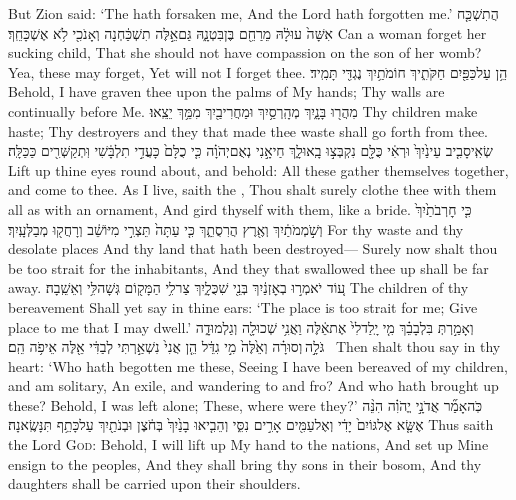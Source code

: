 {But Zion said: ‘The \lord\space hath forsaken me, And the Lord hath forgotten me.’}
{הֲתִשְׁכַּ֤ח אִשָּׁה֙ עוּלָ֔הּ מֵרַחֵ֖ם בֶּן\maqqaf בִּטְנָ֑הּ גַּם\maqqaf אֵ֣לֶּה תִשְׁכַּ֔חְנָה וְאָנֹכִ֖י לֹ֥א אֶשְׁכָּחֵֽךְ׃}
{Can a woman forget her sucking child, That she should not have compassion on the son of her womb? Yea, these may forget, Yet will not I forget thee.}
{הֵ֥ן עַל\maqqaf כַּפַּ֖יִם חַקֹּתִ֑יךְ חוֹמֹתַ֥יִךְ נֶגְדִּ֖י תָּמִֽיד׃}
{Behold, I have graven thee upon the palms of My hands; Thy walls are continually before Me.}
{מִהֲר֖וּ בָּנָ֑יִךְ מְהָֽרְסַ֥יִךְ וּמַחֲרִיבַ֖יִךְ מִמֵּ֥ךְ יֵצֵֽאוּ׃}
{Thy children make haste; Thy destroyers and they that made thee waste shall go forth from thee.}
{שְׂאִֽי\maqqaf סָבִ֤יב עֵינַ֙יִךְ֙ וּרְאִ֔י כֻּלָּ֖ם נִקְבְּצ֣וּ בָֽאוּ\maqqaf לָ֑ךְ חַי\maqqaf אָ֣נִי נְאֻם\maqqaf יְהֹוָ֗ה כִּ֤י כֻלָּם֙ כָּעֲדִ֣י תִלְבָּ֔שִׁי וּֽתְקַשְּׁרִ֖ים כַּכַּלָּֽה׃}
{Lift up thine eyes round about, and behold: All these gather themselves together, and come to thee. As I live, saith the \lord, Thou shalt surely clothe thee with them all as with an ornament, And gird thyself with them, like a bride.}
{כִּ֤י חׇרְבֹתַ֙יִךְ֙ וְשֹׁ֣מְמֹתַ֔יִךְ וְאֶ֖רֶץ הֲרִסֻתֵ֑ךְ כִּ֤י עַתָּה֙ תֵּצְרִ֣י מִיּוֹשֵׁ֔ב וְרָחֲק֖וּ מְבַלְּעָֽיִךְ׃}
{For thy waste and thy desolate places And thy land that hath been destroyed— Surely now shalt thou be too strait for the inhabitants, And they that swallowed thee up shall be far away.}
{ע֚וֹד יֹאמְר֣וּ בְאׇזְנַ֔יִךְ בְּנֵ֖י שִׁכֻּלָ֑יִךְ צַר\maqqaf לִ֥י הַמָּק֖וֹם גְּשָׁה\maqqaf לִּ֥י וְאֵשֵֽׁבָה׃}
{The children of thy bereavement Shall yet say in thine ears: ‘The place is too strait for me; Give place to me that I may dwell.’}
{וְאָמַ֣רְתְּ בִּלְבָבֵ֗ךְ מִ֤י יָֽלַד\maqqaf לִי֙ אֶת\maqqaf אֵ֔לֶּה וַאֲנִ֥י שְׁכוּלָ֖ה וְגַלְמוּדָ֑ה גֹּלָ֣ה \legarmeh  וְסוּרָ֗ה וְאֵ֙לֶּה֙ מִ֣י גִדֵּ֔ל הֵ֤ן אֲנִי֙ נִשְׁאַ֣רְתִּי לְבַדִּ֔י אֵ֖לֶּה אֵיפֹ֥ה הֵֽם׃ \petucha }
{Then shalt thou say in thy heart: ‘Who hath begotten me these, Seeing I have been bereaved of my children, and am solitary, An exile, and wandering to and fro? And who hath brought up these? Behold, I was left alone; These, where were they?’}
{כֹּֽה\maqqaf אָמַ֞ר אֲדֹנָ֣י יֱהֹוִ֗ה הִנֵּ֨ה אֶשָּׂ֤א אֶל\maqqaf גּוֹיִם֙ יָדִ֔י וְאֶל\maqqaf עַמִּ֖ים אָרִ֣ים נִסִּ֑י וְהֵבִ֤יאוּ בָנַ֙יִךְ֙ בְּחֹ֔צֶן וּבְנֹתַ֖יִךְ עַל\maqqaf כָּתֵ֥ף תִּנָּשֶֽׂאנָה׃}
{Thus saith the Lord \textsc{God}: Behold, I will lift up My hand to the nations, And set up Mine ensign to the peoples, And they shall bring thy sons in their bosom, And thy daughters shall be carried upon their shoulders.}
